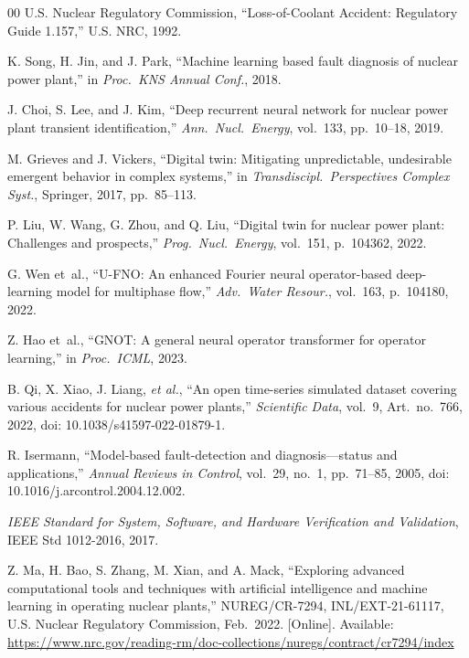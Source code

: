 \documentclass[journal]{IEEEtran}
\begin{document}
\begin{thebibliography}{00}
U.S. Nuclear Regulatory Commission,
``Loss-of-Coolant Accident: Regulatory Guide 1.157,''
U.S. NRC, 1992.

K. Song, H. Jin, and J. Park,
``Machine learning based fault diagnosis of nuclear power plant,''
in \textit{Proc.\ KNS Annual Conf.}, 2018.

J. Choi, S. Lee, and J. Kim,
``Deep recurrent neural network for nuclear power plant transient identification,''
\textit{Ann.\ Nucl.\ Energy}, vol.~133, pp.~10--18, 2019.

M. Grieves and J. Vickers,
``Digital twin: Mitigating unpredictable, undesirable emergent behavior in complex systems,''
in \textit{Transdiscipl.\ Perspectives Complex Syst.}, Springer, 2017, pp.~85--113.

P. Liu, W. Wang, G. Zhou, and Q. Liu,
``Digital twin for nuclear power plant: Challenges and prospects,''
\textit{Prog.\ Nucl.\ Energy}, vol.~151, p.~104362, 2022.

G. Wen et~al.,
``U-FNO: An enhanced Fourier neural operator-based deep-learning model for multiphase flow,''
\textit{Adv.\ Water Resour.}, vol.~163, p.~104180, 2022.

Z. Hao et~al.,
``GNOT: A general neural operator transformer for operator learning,''
in \textit{Proc.\ ICML}, 2023.

B. Qi, X. Xiao, J. Liang, \emph{et al.},
``An open time-series simulated dataset covering various accidents for nuclear power plants,''
\textit{Scientific Data}, vol.~9, Art.~no.~766, 2022, doi: 10.1038/s41597-022-01879-1.

R. Isermann,
``Model-based fault-detection and diagnosis---status and applications,''
\textit{Annual Reviews in Control}, vol.~29, no.~1, pp.~71--85, 2005, doi: 10.1016/j.arcontrol.2004.12.002.

\textit{IEEE Standard for System, Software, and Hardware Verification and Validation},
IEEE Std 1012-2016, 2017.

Z. Ma, H. Bao, S. Zhang, M. Xian, and A. Mack,
``Exploring advanced computational tools and techniques with artificial intelligence and machine learning in operating nuclear plants,''
NUREG/CR-7294, INL/EXT-21-61117, U.S. Nuclear Regulatory Commission, Feb.~2022. [Online]. Available: \url{https://www.nrc.gov/reading-rm/doc-collections/nuregs/contract/cr7294/index}


\end{thebibliography}
\end{document}

